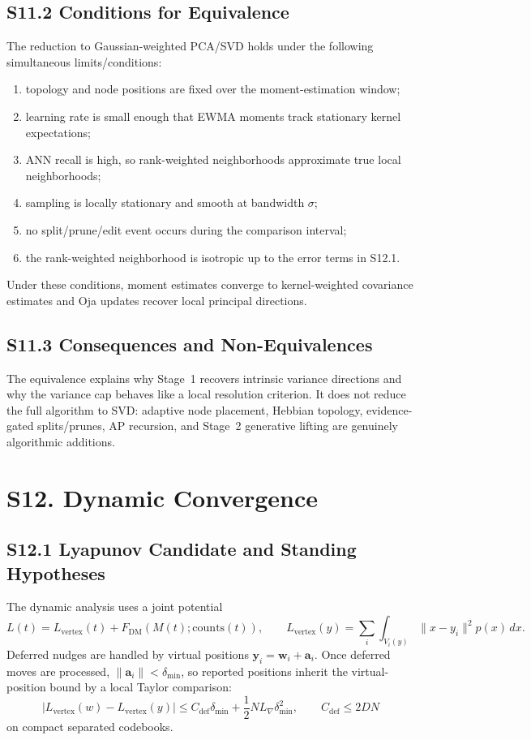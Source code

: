 \documentclass[11pt]{article}
\begin{document}
\subsection*{S11.2 Conditions for Equivalence}
The reduction to Gaussian-weighted PCA/SVD holds under the following simultaneous limits/conditions:
\begin{enumerate}[leftmargin=1.5em]
  \item topology and node positions are fixed over the moment-estimation window;
  \item learning rate is small enough that EWMA moments track stationary kernel expectations;
  \item ANN recall is high, so rank-weighted neighborhoods approximate true local neighborhoods;
  \item sampling is locally stationary and smooth at bandwidth $\sigma$;
  \item no split/prune/edit event occurs during the comparison interval;
  \item the rank-weighted neighborhood is isotropic up to the error terms in S12.1.
\end{enumerate}
Under these conditions, moment estimates converge to kernel-weighted covariance estimates and Oja updates recover local principal directions.

\subsection*{S11.3 Consequences and Non-Equivalences}
The equivalence explains why Stage~1 recovers intrinsic variance directions and why the variance cap behaves like a local resolution criterion. It does not reduce the full algorithm to SVD: adaptive node placement, Hebbian topology, evidence-gated splits/prunes, AP recursion, and Stage~2 generative lifting are genuinely algorithmic additions.

\section*{S12. Dynamic Convergence}

\subsection*{S12.1 Lyapunov Candidate and Standing Hypotheses}
The dynamic analysis uses a joint potential
\[
L(t)=L_{\mathrm{vertex}}(t)+F_{\mathrm{DM}}(M(t);\mathrm{counts}(t)),
\qquad
L_{\mathrm{vertex}}(y)
=
\sum_i\int_{V_i(y)}\|x-y_i\|^2p(x)\,dx.
\]
Deferred nudges are handled by virtual positions $\mathbf y_i=\mathbf w_i+\mathbf a_i$. Once deferred moves are processed, $\|\mathbf a_i\|<\delta_{\min}$, so reported positions inherit the virtual-position bound by a local Taylor comparison:
\[
\big|L_{\mathrm{vertex}}(w)-L_{\mathrm{vertex}}(y)\big|
\le
C_{\mathrm{def}}\delta_{\min}
+\frac12NL_\nabla\delta_{\min}^2,
\qquad
C_{\mathrm{def}}\le2DN
\]
on compact separated codebooks.
\end{document}
